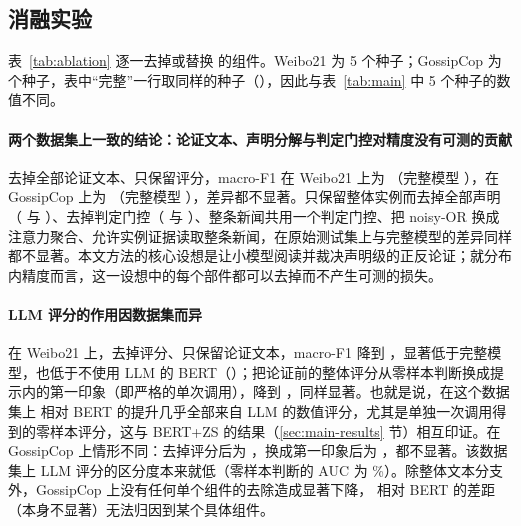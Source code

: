 \subsection{消融实验}\label{sec:exp-ablation}

\begin{table}[!htbp]
\centering\footnotesize
\setlength{\tabcolsep}{3.4pt}
\caption{\method{} 的消融（macro-F1，\%）。“整条替换”与“单元替换”分别为全部测试样本的分析被整条替换、全部声明被逐条替换时的结果。Weibo21 为 5 个种子，GossipCop 为 3 个种子。$^{*}$ 表示在同一评测条件下与完整模型的差异显著（两种检验均 $p<0.05$，未做多重比较校正）。}\label{tab:ablation}
\end{table}

表~\ref{tab:ablation} 逐一去掉或替换 \method{} 的组件。Weibo21 为 5 个种子；GossipCop 为  个种子，表中“完整”一行取同样的种子（），因此与表~\ref{tab:main} 中 5 个种子的数值不同。

\paragraph{两个数据集上一致的结论：论证文本、声明分解与判定门控对精度没有可测的贡献}
去掉全部论证文本、只保留评分，macro-F1 在 Weibo21 上为 （完整模型 ），在 GossipCop 上为 （完整模型 ），差异都不显著。只保留整体实例而去掉全部声明（ 与 ）、去掉判定门控（ 与 ）、整条新闻共用一个判定门控、把 noisy-OR 换成注意力聚合、允许实例证据读取整条新闻，在原始测试集上与完整模型的差异同样都不显著。本文方法的核心设想是让小模型阅读并裁决声明级的正反论证；就分布内精度而言，这一设想中的每个部件都可以去掉而不产生可测的损失。

\paragraph{LLM 评分的作用因数据集而异}
在 Weibo21 上，去掉评分、只保留论证文本，macro-F1 降到 ，显著低于完整模型，也低于不使用 LLM 的 BERT（）；把论证前的整体评分从零样本判断换成提示内的第一印象（即严格的单次调用），降到 ，同样显著。也就是说，在这个数据集上 \method{} 相对 BERT 的提升几乎全部来自 LLM 的数值评分，尤其是单独一次调用得到的零样本评分，这与 BERT+ZS 的结果（\ref{sec:main-results} 节）相互印证。在 GossipCop 上情形不同：去掉评分后为 ，换成第一印象后为 ，都不显著。该数据集上 LLM 评分的区分度本来就低（零样本判断的 AUC 为 \%）。除整体文本分支外，GossipCop 上没有任何单个组件的去除造成显著下降，\method{} 相对 BERT 的差距（本身不显著）无法归因到某个具体组件。

